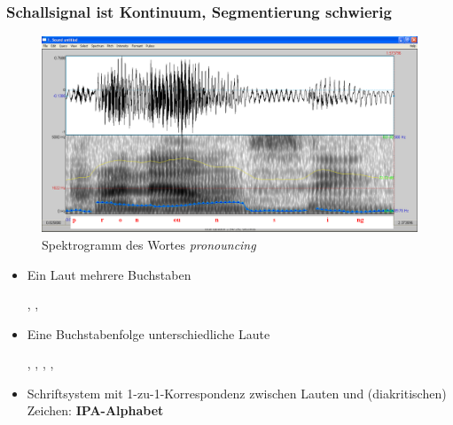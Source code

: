 \begin{frame}
\frametitle{Schallsignal ist Kontinuum, Segmentierung schwierig}

	\begin{figure}[H]
	\centering
	
	\includegraphics[scale=0.2]{material/04Pronouncing}
	\caption{Spektrogramm des Wortes \emph{pronouncing}}
	\end{figure}	
	
\end{frame}


\begin{frame}

		\begin{itemize}
			
			\item Ein Laut \ras mehrere Buchstaben

			\ea \textipa{[s]} \ras {}, , 
			\z
			
			
			\item Eine Buchstabenfolge \ras unterschiedliche Laute

			\ea {} \ras {}, , , , 
			\z

			
			\item[\ras] Schriftsystem mit 1-zu-1-Korrespondenz zwischen Lauten und (diakritischen) Zeichen: \textbf{IPA-Alphabet}
		\end{itemize}
		
\end{frame}


